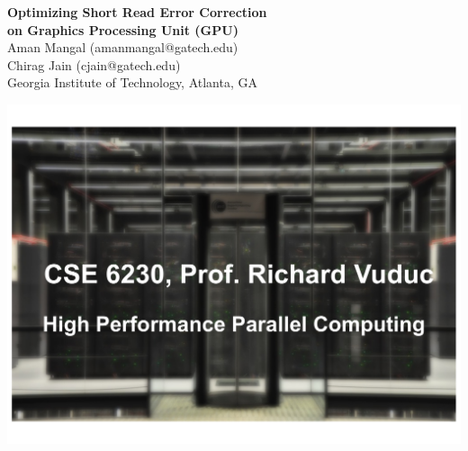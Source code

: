 \documentclass[a0,portrait]{a0poster}
\begin{document}



\begin{minipage}[b]{0.71\linewidth}
\VeryHuge \color{Black} \textbf{Optimizing Short Read Error Correction \\on Graphics Processing Unit (GPU)} \color{Black}\\[0.4cm] %
\huge Aman Mangal (amanmangal@gatech.edu) \\ Chirag Jain (cjain@gatech.edu)\\[0.5cm] %
\huge Georgia Institute of Technology, Atlanta, GA\\ %
\end{minipage}
%
\begin{minipage}[b]{0.25\linewidth}
\includegraphics[width=20cm]{logo.pdf}\\
\end{minipage}

\vspace{0.8cm} %
\end{document}
